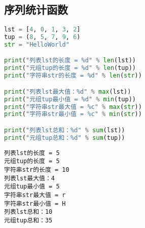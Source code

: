 \vspace{0.5cm}

\subsection{序列统计函数}

\begin{table}[H]
	\centering
	\caption{序列统计函数}
\end{table}

\vspace{0.5cm}


\begin{lstlisting}[language=Python]
lst = [4, 0, 1, 3, 2]
tup = (8, 5, 7, 9, 6)
str = "HelloWorld"

print("列表lst的长度 = %d" % len(lst))
print("元组tup的长度 = %d" % len(tup))
print("字符串str的长度 = %d" % len(str))

print("列表lst最大值：%d" % max(lst))
print("元组tup最小值 = %d" % min(tup))
print("字符串str最大值 = %c" % max(str))
print("字符串str最小值 = %c" % min(str))

print("列表lst总和：%d" % sum(lst))
print("元组tup总和：%d" % sum(tup))
\end{lstlisting}

\begin{tcolorbox}
	\begin{verbatim}
列表lst的长度 = 5
元组tup的长度 = 5
字符串str的长度 = 10
列表lst最大值：4
元组tup最小值 = 5
字符串str最大值 = r
字符串str最小值 = H
列表lst总和：10
元组tup总和：35
\end{verbatim}
\end{tcolorbox}

